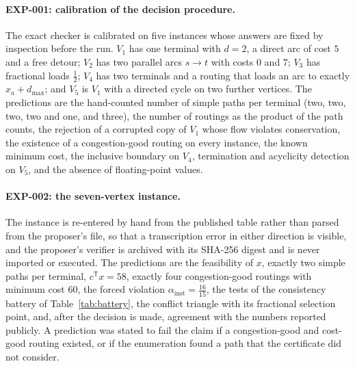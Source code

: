 \documentclass[11pt]{article}
\theoremstyle{remark}
\newcommand{\EXP}[1]{\mbox{EXP-#1}}
\newcommand{\dmax}{d_{\max}}
\begin{document}
\paragraph{\EXP{001}: calibration of the decision procedure.} The exact checker is calibrated on five instances whose answers are fixed by inspection before the run. $V_1$ has one terminal
with $d=2$, a direct arc of cost $5$ and a free detour; $V_2$ has two parallel arcs $s\to t$ with costs $0$ and $7$; $V_3$ has fractional loads $\tfrac12$; $V_4$ has two terminals and a routing that loads an
arc to exactly $x_a+\dmax$; and $V_5$ is $V_1$ with a directed cycle on two further vertices. The predictions are the hand-counted number of simple paths per terminal (two, two, two, two and one, and three), the number of routings as the
product of the path counts, the rejection of a corrupted copy of $V_1$ whose flow violates conservation, the existence of a congestion-good routing on every instance, the known minimum cost, the inclusive boundary on $V_4$,
termination and acyclicity detection on $V_5$, and the absence of floating-point values.

\paragraph{\EXP{002}: the seven-vertex instance.} The instance is re-entered by hand from the published table rather than parsed from the proposer's file, so that a transcription error in either direction is visible, and
the proposer's verifier is archived with its SHA-256 digest and is never imported or executed. The predictions are the feasibility of $x$, exactly two simple paths per terminal, $c^{\mathsf T}x=58$, exactly four congestion-good
routings with minimum cost $60$, the forced violation $\alpha_{\mathrm{inst}}=\tfrac{16}{15}$, the tests of the consistency battery of Table~\ref{tab:battery}, the conflict triangle with its fractional selection point, and, after the decision is made, agreement with
the numbers reported publicly. A prediction was stated to fail the claim if a congestion-good and cost-good routing existed, or if the enumeration found a path that the certificate did not consider.
\end{document}
